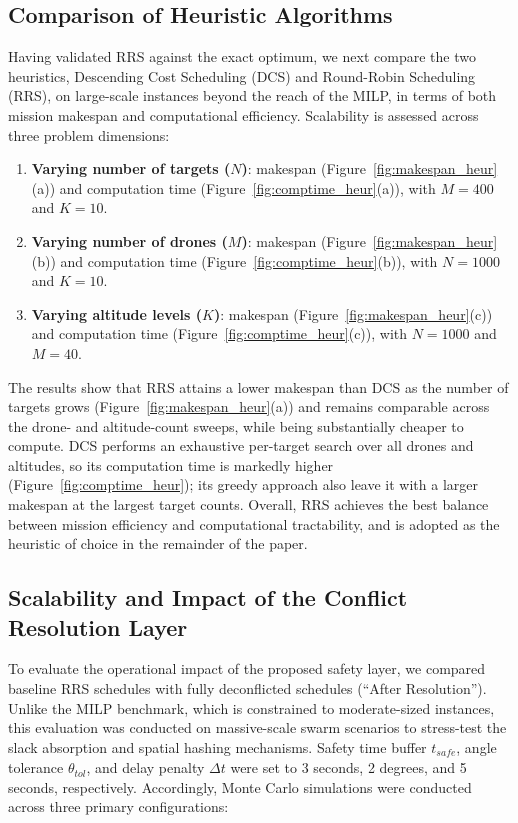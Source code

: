 \documentclass[subscriptcorrection,upint,nolists, varvw,barcolor=Goldenrod3,mathalfa=cal=euler,balance,hyphenate,french]{asmejour} %
\begin{document}
\subsection{Comparison of Heuristic Algorithms}

Having validated RRS against the exact optimum, we next compare the two heuristics, Descending Cost Scheduling (DCS) and Round-Robin Scheduling (RRS), on large-scale instances beyond the reach of the MILP, in terms of both mission makespan and computational efficiency. Scalability is assessed across three problem dimensions:


\begin{enumerate}
    \item \textbf{Varying number of targets (\(N\))}: makespan (Figure~\ref{fig:makespan_heur}(a)) and computation time (Figure~\ref{fig:comptime_heur}(a)), with \(M=400\) and \(K=10\).
    \item \textbf{Varying number of drones (\(M\))}: makespan (Figure~\ref{fig:makespan_heur}(b)) and computation time (Figure~\ref{fig:comptime_heur}(b)), with \(N=1000\) and \(K=10\).
    \item \textbf{Varying altitude levels (\(K\))}: makespan (Figure~\ref{fig:makespan_heur}(c)) and computation time (Figure~\ref{fig:comptime_heur}(c)), with \(N=1000\) and \(M=40\).
\end{enumerate}

The results show that RRS attains a lower makespan than DCS as the number of targets grows (Figure~\ref{fig:makespan_heur}(a)) and remains comparable across the drone- and altitude-count sweeps, while being substantially cheaper to compute. DCS performs an exhaustive per-target search over all drones and altitudes, so its computation time is markedly higher (Figure~\ref{fig:comptime_heur}); its greedy approach also leave it with a larger makespan at the largest target counts. Overall, RRS achieves the best balance between mission efficiency and computational tractability, and is adopted as the heuristic of choice in the remainder of the paper.

\subsection{Scalability and Impact of the Conflict Resolution Layer}

To evaluate the operational impact of the proposed safety layer, we compared baseline RRS schedules with fully deconflicted schedules (``After Resolution'').
Unlike the MILP benchmark, which is constrained to moderate-sized instances, this evaluation was conducted on massive-scale swarm scenarios to stress-test the slack absorption and spatial hashing mechanisms.
Safety time buffer $t_{\mathit{safe}}$, angle tolerance $\theta_{\mathit{tol}}$, and delay penalty $\Delta t$ were set to 3 seconds, 2 degrees, and 5 seconds, respectively. 
Accordingly, Monte Carlo simulations were conducted across three primary configurations:
\end{document}
